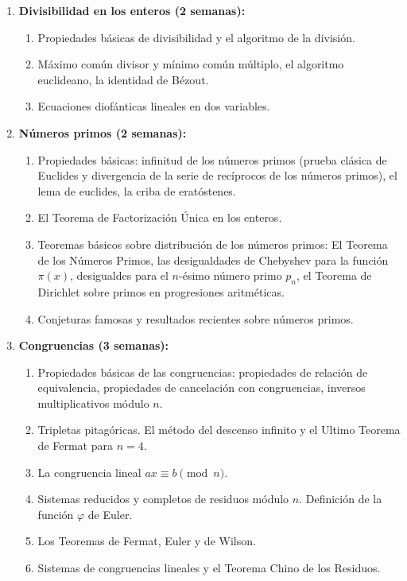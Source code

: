 \begin{refsection}
\begin{enumerate}
\item \textbf{Divisibilidad en los enteros (2 semanas):} 
\begin{enumerate}
    \item Propiedades básicas de divisibilidad y el algoritmo de la división.
    \item Máximo común divisor y mínimo común múltiplo, el algoritmo euclideano, la identidad de Bézout.
    \item Ecuaciones diofánticas lineales en dos variables.
\end{enumerate}

\item \textbf{Números primos (2 semanas):} 
\begin{enumerate}
    \item Propiedades básicas: infinitud de los números primos (prueba clásica de Euclides y divergencia de la serie de recíprocos de los números primos), el lema de euclides, la criba de eratóstenes.
    \item El Teorema de Factorización Única en los enteros.
    \item Teoremas básicos sobre distribución de los números primos: El Teorema de los Números Primos, las desigualdades de Chebyshev para la función $\pi(x)$, desigualdes para el $n$-ésimo número primo $p_n$, el Teorema de Dirichlet sobre primos en progresiones aritméticas.
    \item Conjeturas famosas y resultados recientes sobre números primos.
\end{enumerate}

\item \textbf{Congruencias (3 semanas):} 
\begin{enumerate}
    \item Propiedades básicas de las congruencias: propiedades de relación de equivalencia, propiedades de cancelación con congruencias, inversos multiplicativos módulo $n$.
    \item Tripletas pitagóricas. El método del descenso infinito y el Ultimo Teorema de Fermat para $n = 4$.
    \item La congruencia lineal $ax \equiv b \pmod{n}$.
    \item Sistemas reducidos y completos de residuos módulo $n$. Definición de la función $\varphi$ de Euler.
    \item Los Teoremas de Fermat, Euler y de Wilson.
    \item Sistemas de congruencias lineales y el Teorema Chino de los Residuos.
\end{enumerate}


\end{enumerate}
\end{refsection}
